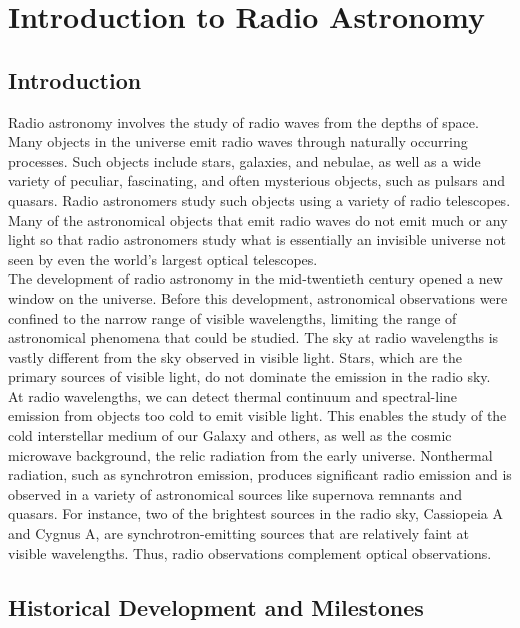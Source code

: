 \chapter{Introduction to Radio Astronomy}

\section{Introduction}
Radio astronomy involves the study of radio waves from the depths of space. Many objects in the universe emit radio waves through naturally occurring processes. Such objects include stars, galaxies, and nebulae, as well as a wide variety of peculiar, fascinating, and often mysterious objects, such as pulsars and quasars. Radio astronomers study such objects using a variety of radio telescopes. Many of the astronomical objects that emit radio waves do not emit much or any light so that radio astronomers study what is essentially an invisible universe not seen by even the world’s largest optical telescopes. \\

The development of radio astronomy in the mid-twentieth century opened a new window on the universe. Before this development, astronomical observations were confined to the narrow range of visible wavelengths, limiting the range of astronomical phenomena that could be studied. The sky at radio wavelengths is vastly different from the sky observed in visible light. Stars, which are the primary sources of visible light, do not dominate the emission in the radio sky. \\

At radio wavelengths, we can detect thermal continuum and spectral-line emission from objects too cold to emit visible light. This enables the study of the cold interstellar medium of our Galaxy and others, as well as the cosmic microwave background, the relic radiation from the early universe. Nonthermal radiation, such as synchrotron emission, produces significant radio emission and is observed in a variety of astronomical sources like supernova remnants and quasars. For instance, two of the brightest sources in the radio sky, Cassiopeia A and Cygnus A, are synchrotron-emitting sources that are relatively faint at visible wavelengths. Thus, radio observations complement optical observations. \\

\clearpage

\section{Historical Development and Milestones}

